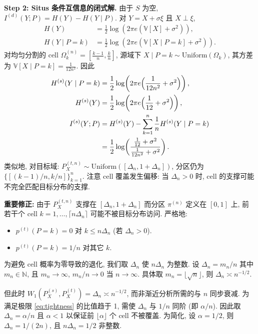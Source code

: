 \documentclass[12pt,a4paper]{article}
\newcommand{\V}{\mathbb{V}}
\newcommand{\Wass}{W_1}
\begin{document}
\textbf{Step 2: Situs 条件互信息的闭式解.}
由于 $S$ 为空, $I^{(d)}(Y;P) = H(Y)-H(Y\mid P)$.
对 $Y = X + \sigma\xi$ 且 $X\perp\xi$,
\begin{align*}
    H(Y) &= \frac12\log(2\pi e(\V[X]+\sigma^2)),\\
    H(Y\mid P=k) &= \frac12\log(2\pi e(\V[X\mid P=k]+\sigma^2)).
\end{align*}
对均匀分割的 cell $\Omega_k^{(n)} = [\frac{k-1}{n},\frac{k}{n}]$,
源域下 $X\mid P=k\sim\mathrm{Uniform}(\Omega_k)$, 其方差为
$\V[X\mid P=k] = \frac{1}{12n^2}$. 因此
\begin{align*}
    H^{(s)}(Y\mid P=k) &= \frac12\log\!\left(2\pi e\Bigl(
                         \frac{1}{12n^2} + \sigma^2\Bigr)\right),\\
    H^{(s)}(Y) &= \frac12\log\!\left(2\pi e\Bigl(
                 \frac{1}{12} + \sigma^2\Bigr)\right),\\
    I^{(s)}(Y;P) &= H^{(s)}(Y) - \sum_{k=1}^n \frac1n H^{(s)}(Y\mid P=k)\\
    &= \frac12\log\!\left( \frac{\frac{1}{12}+\sigma^2}
                                 {\frac{1}{12n^2}+\sigma^2} \right).
\end{align*}
类似地, 对目标域: $P_X^{(t,n)}\sim\mathrm{Uniform}([\Delta_n,1+\Delta_n])$,
分区仍为 $\{[(k-1)/n,k/n]\}_{k=1}^n$. 注意 cell 覆盖发生偏移:
当 $\Delta_n>0$ 时, cell 的支撑可能不完全匹配目标分布的支撑.

\textbf{重要修正:} 由于 $P_X^{(t,n)}$ 支撑在 $[\Delta_n,1+\Delta_n]$
而分区 $\pi^{(n)}$ 定义在 $[0,1]$ 上, 前若干个 cell
$k=1,\dots,\lceil n\Delta_n\rceil$ 可能不被目标分布访问.
严格地:
\begin{itemize}
    \item $p^{(t)}(P=k) = 0$ 对 $k\leq n\Delta_n$ (若 $\Delta_n>0$).
    \item $p^{(t)}(P=k) = 1/n$ 对其它 $k$.
\end{itemize}
为避免 cell 概率为零导致的退化, 我们取 $\Delta_n$ 使 $n\Delta_n$
为整数. 设 $\Delta_n = m_n/n$ 其中 $m_n\in\mathbb{N}$, 且
$m_n\to\infty$, $m_n/n\to0$ 当 $n\to\infty$. 具体取
$m_n=\lfloor\sqrt{n}\rfloor$, 则 $\Delta_n \asymp n^{-1/2}$.

但此时 $\Wass(P^{(s)}_X,P^{(t)}_X)=\Delta_n \asymp n^{-1/2}$,
而非渐近分析所需的与 $n$ 同步衰减. 为满足极限 \eqref{eq:tightness}
的比值趋于 1, 需使 $\Delta_n$ 与 $1/n$ 同阶 (即 $\alpha/n$).
因此取 $\Delta_n = \alpha/n$ 且 $\alpha < 1$ 以保证前
$\lfloor\alpha\rfloor$ 个 cell 不被覆盖. 为简化, 设 $\alpha=1/2$,
则 $\Delta_n = 1/(2n)$, 且 $n\Delta_n = 1/2$ 非整数.
\end{document}
